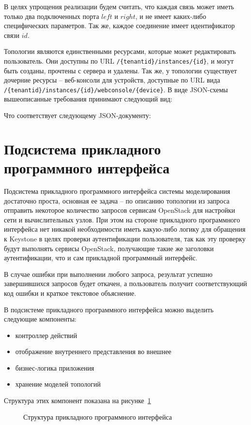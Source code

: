 В целях упрощения реализации будем считать, что каждая связь может иметь только два 
подключенных порта  $left$ и $right$, и не имеет каких-либо специфических параметров.
Так же, каждое соединение имеет идентификатор связи $id$.

Топологии являются единственными ресурсами, которые может редактировать пользователь.
Они доступны по URL \verb`/{tenantid}/instances/{id}`, и могут быть созданы, прочтены с сервера и удалены.
Так же, у топологии существует дочерние ресурсы -- веб-консоли для устройств,
доступные по URL вида \verb`/{tenantid}/instances/{id}/webconsole/{device}`.
В виде JSON-схемы вышеописанные требования принимают следующий вид:



Что соответствует следующему JSON-документу:




\section{Подсистема прикладного программного интерфейса}

Подсистема прикладного программного интерфейса системы моделирования достаточно проста,
основная ее задача -- по описанию топологии из запроса отправить некоторое количество
запросов сервисам OpenStack для настройки сети и вычислительных узлов.
При этом на стороне прикладного программного интерфейса нет никакой необходимости 
иметь какую-либо логику для обращения к Keystone в целях проверки аутентификации пользователя,
так как эту проверку будут выполнять сервисы OpenStack, получающие такие же заголовки
аутентификации, что и сам прикладной программный интерфейс.

В случае ошибки при выполнении любого запроса, результат успешно завершившихся запросов
будет откачен, а пользователь получит соответствующий код ошибки и краткое текстовое объяснение.

В подсистеме прикладного программного интерфейса можно выделить следующие компоненты:
\begin{itemize}
    \item контроллер действий
    \item отображение внутреннего представления во внешнее
    \item бизнес-логика приложения
    \item хранение моделей топологий
\end{itemize}
Структура этих компонент показана на рисунке~\ref{fig:api-uml}
\begin{figure}
  \centering
  {\footnotesize\tt}
  \caption{Структура прикладного программного интерфейса}
  \label{fig:api-uml}
\end{figure} 

